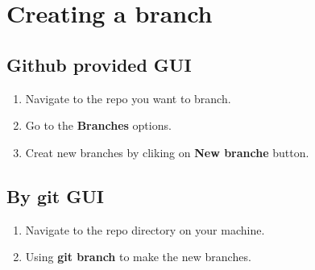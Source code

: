 \documentclass[11pt]{article}
\author{ok}
\date{\today}
\title{}
\begin{document}
\tableofcontents

\section{Creating a branch}
\label{sec:orgb98bb8a}
\subsection{Github provided GUI}
\label{sec:org218f1dd}
\begin{enumerate}
\item Navigate to the repo you want to branch.
\item Go to the \textbf{Branches} options.
\item Creat new branches by cliking on \textbf{New branche} button.
\end{enumerate}
\subsection{By git GUI}
\label{sec:org128cb99}
\begin{enumerate}
\item Navigate to the repo directory on your machine.
\item Using \textbf{git branch} to make the new branches.
\end{enumerate}
\end{document}
